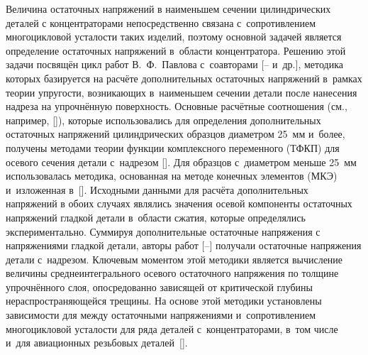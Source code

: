 Величина остаточных напряжений в наименьшем сечении цилиндрических деталей с концентраторами непосредственно связана с~сопротивлением многоцикловой усталости  таких изделий, поэтому основной задачей является определение остаточных напряжений в~области концентратора.
Решению этой задачи посвящён цикл работ В.~Ф.~Павлова  с~соавторами [-- и~др.],
методика которых базируется на  расчёте дополнительных остаточных напряжений в~рамках теории упругости, возникающих в~наименьшем сечении детали после нанесения надреза на упрочнённую поверхность. 
Основные расчётные соотношения (см., например, []), которые использовались для определения дополнительных остаточных напряжений цилиндрических образцов диаметром 25~мм и~более, получены методами теории функции комплексного переменного (ТФКП) для осевого сечения детали с~надрезом [].
Для образцов с~диаметром меньше 25~мм использовалась методика, основанная на методе конечных элементов (МКЭ) и~изложенная в~[].
Исходными данными для расчёта дополнительных напряжений в обоих случаях являлись значения осевой компоненты остаточных напряжений гладкой детали в~области сжатия, которые определялись экспериментально.
Суммируя дополнительные остаточные напряжения с напряжениями гладкой детали, авторы работ [--] получали остаточные напряжения детали с~надрезом.
Ключевым моментом этой методики является вычисление величины среднеинтегрального осевого остаточного напряжения по толщине упрочнённого слоя, опосредованно зависящей от критической глубины нераспространяющейся трещины.
На основе этой методики установлены зависимости для между остаточными напряжениями и~сопротивлением многоцикловой усталости для ряда деталей с~концентраторами, в~том числе и~для  авиационных резьбовых деталей~[].

